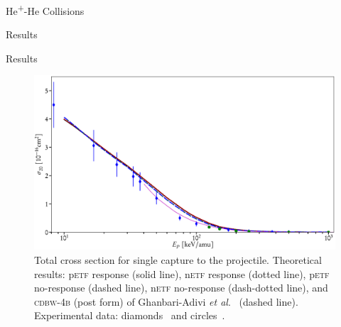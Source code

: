 \documentclass[letterpaper, 11 pt]{report}
\begin{document}
\begin{chapter}{\texorpdfstring{He\textsuperscript{+}}{He+}-He Collisions \label{chap:hephe}}
\begin{section}{Results \label{sec:hephe-disc}}
\begin{subsection}{Results \label{sec:hephe-res}}
         \begin{figure}[t]
            \centering
            \includegraphics[width = \linewidth]{./images/hephe-cross/HepHe-120.eps}
            \caption[Total cross section for single capture to the projectile He\textsuperscript{+}-He
                     collisions.]
                    {Total cross section for single capture to the projectile.
                     Theoretical results: p\textsc{etf} response (solid line), n\textsc{etf} response
                                          (dotted line), p\textsc{etf} no-response (dashed line),
                                          n\textsc{etf} no-response (dash-dotted line), and
                                          \textsc{cdbw-4b} (post form) of Ghanbari-Adivi
                                          \textit{et al}.~\cite{GAG15} (dashed line).
                     Experimental data: diamonds~\cite{Dub-89} and circles~\cite{FTFHLP-95}.
                     \label{fig:cs120}}
         \end{figure}


\end{subsection}
\end{section}
\end{chapter}
\end{document}
